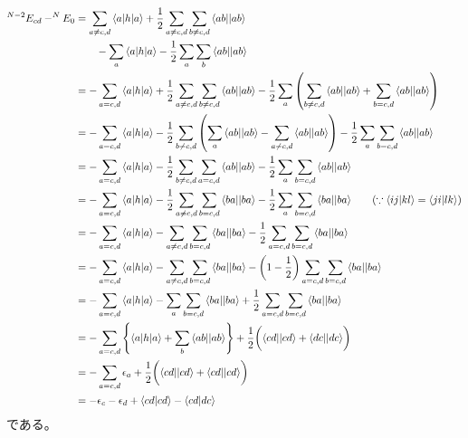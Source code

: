 \begin{align}
	^{N-2}E_{cd}
	-
	^{N}E_0
&=
	\sum_{a\neq c,d}
		\braket{a|h|a}
	+
	\frac{1}{2}
	\sum_{a\neq c,d}
	\sum_{b\neq c,d}
		\antitwo{ab}{ab} \nonumber \\&\qquad
	-
	\sum_{a}
		\braket{a|h|a}
	-
	\frac{1}{2}
	\sum_{a}
	\sum_{b}
		\antitwo{ab}{ab} \\
%
%
&=
	-
	\sum_{a=c,d}
		\braket{a|h|a}
	+
	\frac{1}{2}
	\sum_{a\neq c,d}
	\sum_{b\neq c,d}
		\antitwo{ab}{ab}
	-
	\frac{1}{2}
	\sum_{a}\left(
		\sum_{b\neq c,d} \antitwo{ab}{ab}
		+
		\sum_{b=c,d} \antitwo{ab}{ab}
	\right) \\
%
%
&=
	-
	\sum_{a=c,d}
		\braket{a|h|a}
	-
	\frac{1}{2}
	\sum_{b\neq c,d}\left(
		\sum_{a} \antitwo{ab}{ab}
		-
		\sum_{a\neq c,d} \antitwo{ab}{ab}
	\right)
	-
	\frac{1}{2}
	\sum_{a}
	\sum_{b=c,d}
		\antitwo{ab}{ab} \\
%
%
&=
	-
	\sum_{a=c,d}
		\braket{a|h|a}
	-
	\frac{1}{2}
	\sum_{b\neq c,d}
	\sum_{a=c,d}
		\antitwo{ab}{ab}
	-
	\frac{1}{2}
	\sum_{a}
	\sum_{b=c,d}
		\antitwo{ab}{ab} \\
%
%
&=
	-
	\sum_{a=c,d}
		\braket{a|h|a}
	-
	\frac{1}{2}
	\sum_{a\neq c,d}
	\sum_{b=c,d}
		\antitwo{ba}{ba}
	-
	\frac{1}{2}
	\sum_{a}
	\sum_{b=c,d}
		\antitwo{ba}{ba}
	\qquad
	(\because \phystwo{ij}{kl}=\phystwo{ji}{lk}) \\
%
%
&=
	-
	\sum_{a=c,d}
		\braket{a|h|a}
	-
	\sum_{a\neq c,d}
	\sum_{b=c,d}
		\antitwo{ba}{ba}
	-
	\frac{1}{2}
	\sum_{a=c,d}
	\sum_{b=c,d}
		\antitwo{ba}{ba} \\
%
%
&=
	-
	\sum_{a=c,d}
		\braket{a|h|a}
	-
	\sum_{a\neq c,d}
	\sum_{b=c,d}
		\antitwo{ba}{ba}
	-
	\left(
		1
		-
		\frac{1}{2}
	\right)
	\sum_{a=c,d}
	\sum_{b=c,d}
		\antitwo{ba}{ba} \\
%
%
&=
	-
	\sum_{a=c,d}
		\braket{a|h|a}
	-
	\sum_{a}
	\sum_{b=c,d}
		\antitwo{ba}{ba}
	+
	\frac{1}{2}
	\sum_{a=c,d}
	\sum_{b=c,d}
		\antitwo{ba}{ba} \\
%
%
&=
	-
	\sum_{a=c,d}
	\left\{
		\braket{a|h|a}
		+
		\sum_{b}
			\antitwo{ab}{ab}
	\right\}
	+
	\frac{1}{2}
	\biggl(
		\antitwo{cd}{cd}
		+
		\antitwo{dc}{dc}
	\biggr) \\
%
%
&=
	-
	\sum_{a=c,d}
		\epsilon_a
	+
	\frac{1}{2}
	\biggl(
		\antitwo{cd}{cd}
		+
		\antitwo{cd}{cd}
	\biggr) \\
%
%
&=
	-
	\epsilon_c
	-
	\epsilon_d
	+
	\phystwo{cd}{cd}
	-
	\phystwo{cd}{dc}
\end{align}
である。


